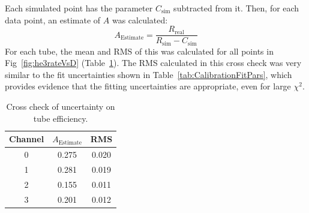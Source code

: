 	Each simulated point has the parameter $C_{\mathrm{sim}}$ subtracted from it. Then, for each data point, an estimate of $A$ was calculated:
\begin{equation}
	A_{\mathrm{Estimate}} = \frac{R_{\mathrm{real}}}{R_{\mathrm{sim}}-C_{\mathrm{sim}}}
\end{equation}
For each tube, the mean and RMS of this was calculated for all points in Fig~\ref{fig:he3rateVsD} (Table~\ref{tab:CrossCheck}). The RMS calculated in this cross check was very similar to the fit uncertainties shown in Table~\ref{tab:CalibrationFitPars}, which provides evidence that the fitting uncertainties are appropriate, even for large $\chi^2$.


\begin{table}[htb]
	\centering
	\begin{tabular}{ ccc }
Channel	&	$A_{\mathrm{Estimate}}$	&	RMS	\\ \hline \hline	
0	&	0.275	&	0.020	\\	
1	&	0.281	&	0.019	\\	
2	&	0.155	&	0.011	\\	
3	&	0.201	&	0.012	\\	\hline

	\end{tabular}
	\caption[Cross check of uncertainty on \he tube efficiency]{Cross check of uncertainty on \he tube efficiency.}
	\label{tab:CrossCheck}
\end{table}









	

